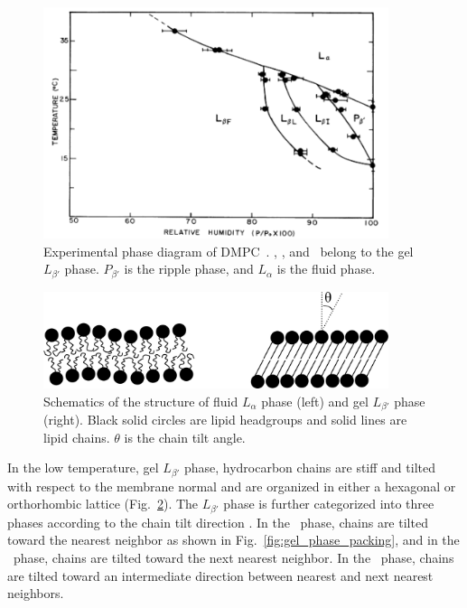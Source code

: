 \begin{figure}[htbp]
  \centering
  \includegraphics[width=0.9\textwidth]{figures/smith_phase_diagram}
  \caption[Experimental phase diagram of DMPC~\cite{ref:Smith88}]
  {Experimental phase diagram of DMPC~\cite{ref:Smith88}.
  \LbetaI, \LbetaL, and \LbetaF\ belong to the gel $L_{\beta'}$ phase. $P_{\beta'}$ is 
  the ripple phase, and $L_\alpha$ is the fluid phase.}
  \label{fig:phase_diagram}
\end{figure}

\begin{figure}[htbp]
  \centering
  \includegraphics[width=0.9\textwidth]{figures/various_phases}
  \caption[Schematics of the structure of fluid $L_\alpha$ phase (left) and 
  gel $L_{\beta'}$ phase (right)]
  {Schematics of the structure of fluid $L_\alpha$ phase (left) and 
  gel $L_{\beta'}$ phase (right). Black solid circles are lipid headgroups 
  and solid lines are lipid chains. $\theta$ is the chain tilt angle.}
  \label{fig:various_phases}
\end{figure}

In the low temperature, gel $L_{\beta'}$
phase, hydrocarbon chains are stiff and tilted with respect to the membrane
normal \cite{ref:Tardieu73} and are organized in either a hexagonal 
or orthorhombic lattice (Fig.~\ref{fig:various_phases}). 
The $L_{\beta'}$ phase is further categorized into three phases according to the 
chain tilt direction \cite{ref:Smith88,ref:Tristram93,Tristram-Nagle02}. 
In the \LbetaI\ phase, chains are tilted toward the 
nearest neighbor as shown in Fig.~\ref{fig:gel_phase_packing}, and
in the \LbetaF\ phase, chains are tilted toward the next nearest neighbor.
In the \LbetaL\ phase, chains are tilted toward an intermediate direction
between nearest and next nearest neighbors.

